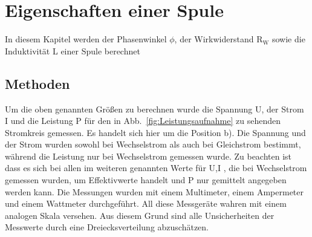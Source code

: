 \section{Eigenschaften einer Spule}
In diesem Kapitel werden der Phasenwinkel $\phi$, der Wirkwiderstand R$_\text{W}$ sowie die Induktivität L einer Spule berechnet

\subsection{Methoden}
Um die oben genannten Größen zu berechnen wurde die Spannung U, der Strom I und die Leistung P für den in Abb.~\ref{fig:Leistungsaufnahme} zu sehenden Stromkreis gemessen. Es handelt sich hier um die Position b).
Die Spannung und der Strom wurden sowohl bei Wechselstrom als auch bei Gleichstrom bestimmt, während die Leistung nur bei Wechselstrom gemessen wurde. Zu beachten ist dass es sich bei allen im weiteren genannten Werte für U,I , die bei Wechselstrom gemessen wurden, um Effektivwerte handelt und P nur gemittelt angegeben werden kann.
Die Messungen wurden mit einem Multimeter, einem Ampermeter und einem Wattmeter durchgeführt.
All diese Messgeräte wahren mit einem analogen Skala versehen. Aus diesem Grund sind alle Unsicherheiten der Messwerte durch eine Dreiecksverteilung abzuschätzen. 
